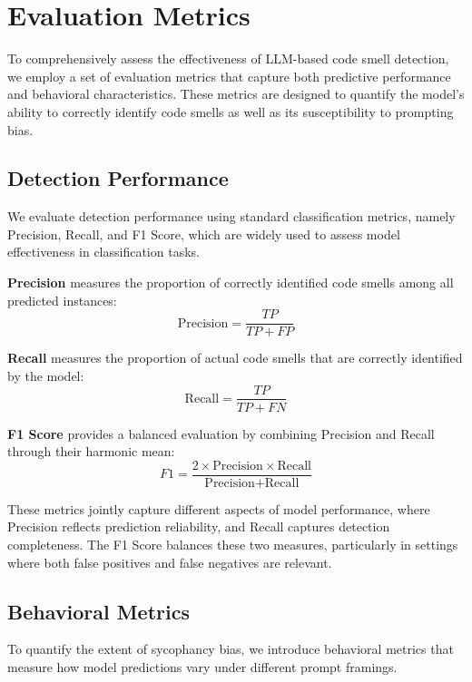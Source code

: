 \documentclass[sigconf,review,anonymous]{acmart}
\begin{document}
\section{Evaluation Metrics}

To comprehensively assess the effectiveness of LLM-based code smell detection, we employ a set of evaluation metrics that capture both predictive performance and behavioral characteristics. These metrics are designed to quantify the model’s ability to correctly identify code smells as well as its susceptibility to prompting bias.

\subsection{Detection Performance}

We evaluate detection performance using standard classification metrics, namely Precision, Recall, and F1 Score, which are widely used to assess model effectiveness in classification tasks.

\textbf{Precision} measures the proportion of correctly identified code smells among all predicted instances:
\begin{equation}
\text{Precision} = \frac{TP}{TP + FP}
\end{equation}

\textbf{Recall} measures the proportion of actual code smells that are correctly identified by the model:
\begin{equation}
\text{Recall} = \frac{TP}{TP + FN}
\end{equation}

\textbf{F1 Score} provides a balanced evaluation by combining Precision and Recall through their harmonic mean:
\begin{equation}
F1 = \frac{2 \times \text{Precision} \times \text{Recall}}{\text{Precision} + \text{Recall}}
\end{equation}

These metrics jointly capture different aspects of model performance, where Precision reflects prediction reliability, and Recall captures detection completeness. The F1 Score balances these two measures, particularly in settings where both false positives and false negatives are relevant.

\subsection{Behavioral Metrics}

To quantify the extent of sycophancy bias, we introduce behavioral metrics that measure how model predictions vary under different prompt framings.
\end{document}
